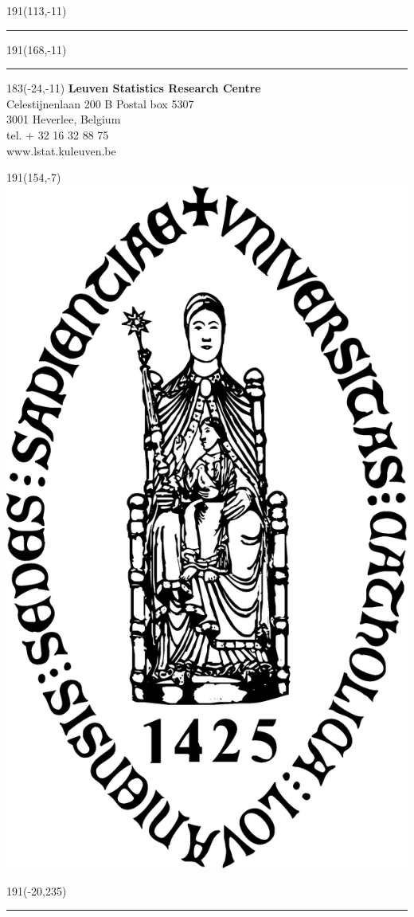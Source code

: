 \documentclass[12pt,a4paper,oneside]{book}
\begin{document}
\thispagestyle{empty}
\sffamily
%
\begin{textblock}{191}(113,-11)
{\color{blueline}\rule{160pt}{5.5pt}}
\end{textblock}
%
\begin{textblock}{191}(168,-11)
{\color{blueline}\rule{5.5pt}{59pt}}
\end{textblock}
%
\begin{textblock}{183}(-24,-11)
\textblockcolour{}
\flushright
\fontsize{7}{7.5}\selectfont
\textbf{Leuven Statistics Research Centre}\\
Celestijnenlaan 200 B Postal box 5307\\
3001 Heverlee, Belgium\\
tel. + 32 16 32 88 75\\
www.lstat.kuleuven.be\\
\end{textblock}
%
\begin{textblock}{191}(154,-7)
\textblockcolour{}
\includegraphics*[height=16.5truemm]{Images/sedes}
\end{textblock}
%
\begin{textblock}{191}(-20,235)
{\color{bluetitle}\rule{544pt}{55pt}}
\end{textblock}
\end{document}
